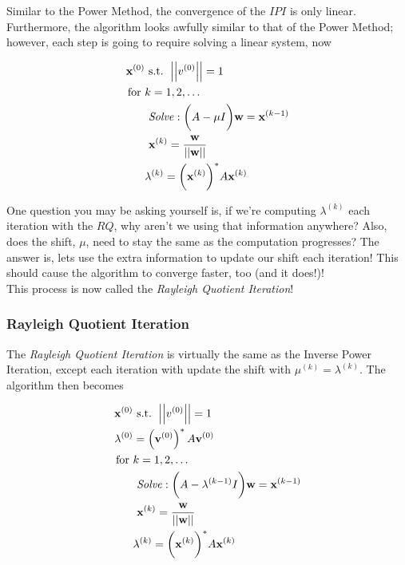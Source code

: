 \documentclass[paper=a4, fontsize=11pt]{scrartcl} %
\numberwithin{equation}{section} %
\numberwithin{figure}{section} %
\numberwithin{table}{section} %
\begin{document}
Similar to the Power Method, the convergence of the $IPI$ is only linear. Furthermore, the algorithm looks awfully similar to that of the Power Method; however, each step is going to require solving a linear system, now

\begin{align*}
\textbf{x}^{(0)} &\mbox{ s.t. } \left|\left|v^{(0)}\right|\right| = 1 \\ 
\mbox{for } &k=1,2,\ldots \\
\ \ \ \ &\ \mbox{\emph{Solve}}: \bigg(A-\mu I\bigg)\textbf{w} = \textbf{x}^{(k-1)} \\
\ \ \ \ &\ \textbf{x}^{(k)} = \frac{ \textbf{w} } { \left|\left| \textbf{w} \right|\right| } \\
\ \ \ \ &\lambda^{(k)} = \bigg( \textbf{x}^{(k)} \bigg)^{*} A \textbf{x}^{(k)} \\
\end{align*}

One question you may be asking yourself is, if we're computing $\lambda^{(k)}$ each iteration with the $RQ$, why aren't we using that information anywhere? Also, does the shift, $\mu$, need to stay the same as the computation progresses? The answer is, lets use the extra information to update our shift each iteration! This should cause the algorithm to converge faster, too (and it does!)!\\

This process is now called the \emph{Rayleigh Quotient Iteration}!

\subsubsection{Rayleigh Quotient Iteration}

The \emph{Rayleigh Quotient Iteration} is virtually the same as the Inverse Power Iteration, except each iteration with update the shift with $\mu^{(k)} = \lambda^{(k)}.$ The algorithm then becomes

\begin{align*}
\textbf{x}^{(0)} &\mbox{ s.t. } \left|\left|v^{(0)}\right|\right| = 1 \\ 
\lambda^{(0)} &= \left( \textbf{v}^{(0)} \right)^{*}A  \textbf{v}^{(0)} \\
\mbox{for } &k=1,2,\ldots \\
\ \ \ \ &\ \mbox{\emph{Solve}}: \bigg(A-\lambda^{(k-1)} I\bigg)\textbf{w} = \textbf{x}^{(k-1)} \\
\ \ \ \ &\ \textbf{x}^{(k)} = \frac{ \textbf{w} } { \left|\left| \textbf{w} \right|\right| } \\
\ \ \ \ &\lambda^{(k)} = \bigg( \textbf{x}^{(k)} \bigg)^{*} A \textbf{x}^{(k)} \\
\end{align*}
\end{document}
